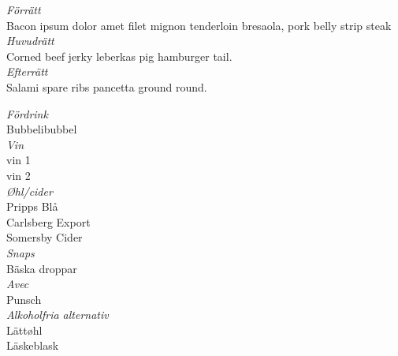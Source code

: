 \documentclass[11pt, a4paper]{memoir} %
\begin{document}
\epigraphfontsize{\small\itshape}
%	

\begin{center}
\Large \textit{Förrätt}\\
\normalsize Bacon ipsum dolor amet filet mignon tenderloin bresaola, pork belly strip steak\\
\bigskip
\Large \textit{Huvudrätt}\\
\normalsize Corned beef jerky leberkas pig hamburger tail. \\
\bigskip
\Large \textit{Efterrätt}\\
\normalsize Salami spare ribs pancetta ground round. \\
\bigskip
\bigskip

\Large\textit{Fördrink}\\
\normalsize Bubbelibubbel\\
\bigskip
\Large\textit{Vin}\\
\normalsize vin 1\\
vin 2\\
\bigskip
\Large\textit{Øhl/cider}\\
\normalsize Pripps Blå\\
Carlsberg Export\\
Somersby Cider\\
\bigskip
\Large\textit{Snaps}\\
\normalsize Bäska droppar\\
\bigskip
\Large\textit{Avec}\\
\normalsize Punsch\\
\bigskip
\Large\textit{Alkoholfria alternativ}\\
\normalsize Lättøhl\\
Läskeblask\\

\end{center}

\twocolumn 


\settowidth{\versewidth}{när vi har fått en tår på tand, en skål.} %
\end{document}
